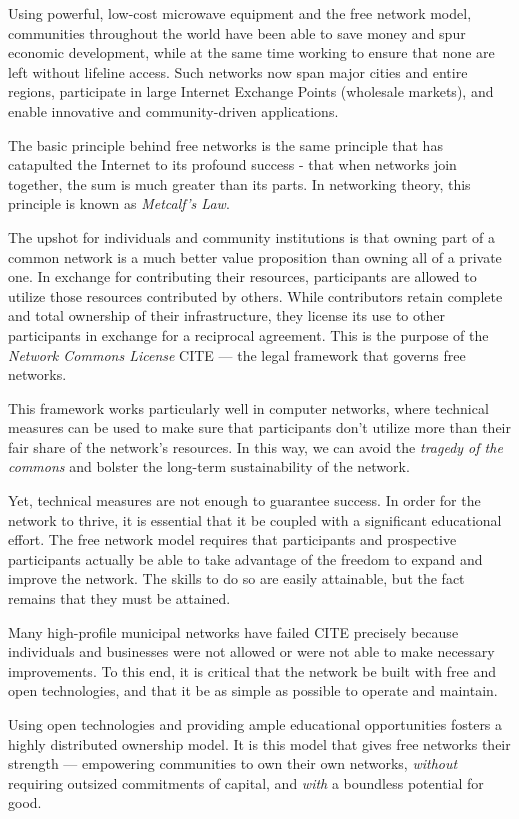 Using powerful, low-cost  microwave equipment and the free network model,
communities throughout the world have been able to save money and spur economic
development, while at the same time
working to ensure that none are left without lifeline access. Such networks now
span major cities and entire regions, participate in large Internet Exchange Points
(wholesale markets), and enable innovative and community-driven 
applications. \par
The basic principle behind free networks is the same principle that has
catapulted the Internet to its profound success - that when networks join
together, the sum is much greater than its parts. In networking theory, this
principle is known as \emph{Metcalf's Law}. \par 
The upshot for individuals and community institutions is that owning part of a
common network is a much better value proposition than owning all of a private
one. In exchange for contributing their resources, participants are
allowed to utilize those resources contributed by others. While contributors
retain complete and total ownership of their infrastructure, they license its
use to other participants in exchange for a reciprocal agreement. This is the
purpose of the \emph{Network Commons License} CITE --- the legal framework that
governs free networks. \par
This framework works particularly well in computer networks, where technical
measures can be used to make sure that participants don't utilize more than
their fair share of the network's resources.
In this way, we can avoid the \emph{tragedy of the commons}
and bolster the long-term sustainability of the network. \par
Yet, technical measures are not enough to guarantee success. In order for the
network to thrive, it is essential that it be coupled with a significant
educational effort. The free network model requires that participants and
prospective participants actually be able to take advantage of the freedom to
expand and improve the network. The skills to do so are easily attainable, but
the fact remains that they must be attained. \par
Many high-profile municipal networks have failed CITE precisely because individuals
and businesses were not allowed or were not able to make necessary improvements.
To this end, it is critical that the network be built with free and open
technologies, and that it be as simple as possible to operate and maintain. \par
Using open technologies and providing ample educational opportunities fosters
a highly distributed ownership model. It is this model that gives free networks
their strength --- empowering communities to own their own networks,
\emph{without} requiring outsized commitments of capital, and \emph{with} a
boundless potential for good.

